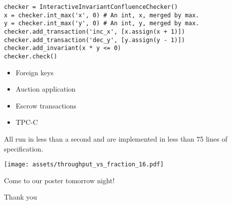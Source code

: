 \begin{frame}[fragile]
  \begin{verbatim}
checker = InteractiveInvariantConfluenceChecker()
x = checker.int_max('x', 0) # An int, x, merged by max.
y = checker.int_max('y', 0) # An int, y, merged by max.
checker.add_transaction('inc_x', [x.assign(x + 1)])
checker.add_transaction('dec_y', [y.assign(y - 1)])
checker.add_invariant(x * y <= 0)
checker.check()\end{verbatim}
\end{frame}

\begin{frame}
  \begin{itemize}
    \item Foreign keys
    \item Auction application
    \item Escrow transactions
    \item TPC-C
  \end{itemize}

  \pause
  All run in less than a second and are implemented in less than 75 lines of
  specification.
\end{frame}

\begin{frame}
  \texttt{[image: assets/throughput\_vs\_fraction\_16.pdf]}
\end{frame}

\begin{frame}
  \begin{center}
    \Huge
    Come to our poster tomorrow night!
  \end{center}
\end{frame}

\begin{frame}
  \begin{center}
    \Huge
    Thank you
  \end{center}
\end{frame}
